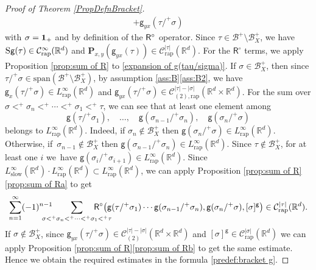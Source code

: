\documentclass[JEP,XML,SOM,Unicode,published]{cedram}
\theoremstyle{plain}
\theoremstyle{definition}
\newcommand{\rap}{\mathrm{rap}}
\newcommand{\slow}{\mathrm{slow}}
\newcommand{\bfP}{\mathbf{P}}
\newcommand{\sfR}{\mathsf{R}}
\newcommand{\sfg}{\mathsf{g}}
\newcommand{\bbR}{\mathbb{R}}
\newcommand{\mcB}{\mathcal{B}}
\newcommand{\mcC}{\mathcal{C}}
\begin{document}
\begin{proof}[Proof of Theorem \ref{PropDefnBracket}]
\begin{multline}
+\sfg_{yx}(\tau/^+\sigma)
\end{multline}
with $\sigma={\bf1}_+$ and by definition of the ${\sf R}^\circ$ operator. Since $\tau\in\mcB^+\setminus\mcB_X^+$, we have $\textsc{S}\sfg(\tau)\in \mcC_\rap^\infty(\bbR^d)$ and $\bfP_{x,y}(\sfg_{yx}(\tau))\in \mcC_\rap^{|\tau|}(\bbR^d)$. For the ${\sfR}^\circ$ terms, we apply Proposition \ref{prop:sum of R} to \eqref{expansion of g(tau/sigma)}. If $\sigma\in\mcB_X^+$, then since $\tau/^+\sigma\in\textrm{span}(\mcB^+\setminus\mcB_X^+)$, by assumption \ref{ass:B}\eqref{ass:B2}, we have $\sfg_x(\tau/^+\sigma)\in L_{\rap}^\infty(\bbR^d)$ and $\sfg_{yx}(\tau/^+\sigma)\in\mcC_{(2),\rap}^{|\tau|-|\sigma|}(\bbR^d\times\bbR^d)$. For the sum over $\sigma<^+\sigma_n<^+\cdots<^+\sigma_1<^+\tau$, we can see that at least one element among
\[
\sfg(\tau/^+\sigma_1),\quad \dots,\quad\sfg(\sigma_{n-1}/^+\sigma_n),\quad\sfg(\sigma_n/^+\sigma)
\]
belongs to $L_\rap^\infty(\bbR^d)$. Indeed, if $\sigma_n\notin\mcB_X^+$ then $\sfg(\sigma_n/^+\sigma)\in L_\rap^\infty(\bbR^d)$. Otherwise, if~$\sigma_{n-1}\notin\mcB_X^+$ then $\sfg(\sigma_{n-1}/^+\sigma_n)\in L_\rap^\infty(\bbR^d)$. Since $\tau\notin\mcB_X^+$, for at least one $i$ we~have $\sfg(\sigma_i/^+\sigma_{i+1})\in L_\rap^\infty(\bbR^d)$. Since $L_\slow^\infty(\bbR^d)\cdot L_\rap^\infty(\bbR^d)\subset L_\rap^\infty(\bbR^d)$, we can apply Proposition \ref{prop:sum of R}\eqref{prop:sum of Ra} to get
\[
\sum_{n=1}^\infty(-1)^{n-1}\hspace*{-5mm}\sum_{\sigma<^+\sigma_n<^+\cdots<^+\sigma_1<^+\tau}\hspace*{-8mm} \sfR^\circ\bigl(\sfg(\tau/^+\sigma_1)\cdots\sfg(\sigma_{n-1}/^+\sigma_n),\sfg(\sigma_n/^+\sigma),[\sigma]^\sfg\bigr)\in \mcC_\rap^{|\tau|}(\bbR^d).
\]
If $\sigma\notin\mcB_X^+$, since $\sfg_{yx}(\tau/^+\sigma)\in\mcC_{(2)}^{|\tau|-|\sigma|}(\bbR^d\times\bbR^d)$ and $[\sigma]^\sfg\in \mcC_\rap^{|\sigma|}(\bbR^d)$ we can apply Proposition \ref{prop:sum of R}\eqref{prop:sum of Rb} to get the same estimate. Hence we obtain the required estimates in the formula \eqref{predef:bracket g}.


\end{proof}
\end{document}

